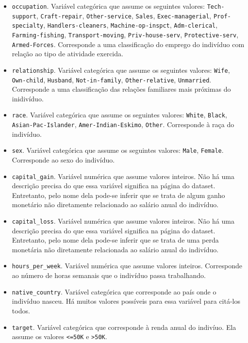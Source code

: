 \documentclass[a4paper, 12pt]{article}
\begin{document}
\begin{itemize}
    \item \verb|occupation|.
        Variável categórica que assume os seguintes valores:
        \verb|Tech-support|, \verb|Craft-repair|, \verb|Other-service|, \verb|Sales|, \verb|Exec-managerial|, \verb|Prof-specialty|, \verb|Handlers-cleaners|, \verb|Machine-op-inspct|, \verb|Adm-clerical|, \verb|Farming-fishing|, \verb|Transport-moving|, \verb|Priv-house-serv|, \verb|Protective-serv|, \verb|Armed-Forces|.
       Corresponde a uma classificação do emprego do indivíduo com relação ao tipo de atividade exercida.
       
    \item \verb|relationship|.
        Variável categórica que assume os seguintes valores:
        \verb|Wife|, \verb|Own-child|, \verb|Husband|, \verb|Not-in-family|, \verb|Other-relative|, \verb|Unmarried|.
        Corresponde a uma classificação das relações familiares mais próximas do inidivíduo.

    \item \verb|race|.
        Variável categórica que assume os seguintes valores:
        \verb|White|, \verb|Black|, \verb|Asian-Pac-Islander|, \verb|Amer-Indian-Eskimo|, \verb|Other|.
        Corresponde à raça do indivíduo.

    \item \verb|sex|.
        Variável categórica que assume os seguintes valores:
        \verb|Male|, \verb|Female|.
        Corresponde ao sexo do indivíduo.

    \item \verb|capital_gain|.
        Variável numérica que assume valores inteiros.
        Não há uma descrição precisa do que essa variável significa na página do dataset.
        Entretanto, pelo nome dela pode-se inferir que se trata de algum ganho monetário não diretamente relacionado ao salário anual do indivíduo.

    \item \verb|capital_loss|.
        Variável numérica que assume valores inteiros.
        Não há uma descrição precisa do que essa variável significa na página do dataset.
        Entretanto, pelo nome dela pode-se inferir que se trata de uma perda monetária não diretamente relacionada ao salário anual do indivíduo.

    \item \verb|hours_per_week|.
        Variável numérica que assume valores inteiros.
        Corresponde ao número de horas semanais que o indivíduo passa trabalhando.

    \item \verb|native_country|.
        Variável categórica que corresponde ao país onde o indivíduo nasceu.
        Há muitos valores possíveis para essa variável para citá-los todos.

    \item \verb|target|.
        Variável categórica que corresponde à renda anual do indivíuo.
        Ela assume os valores \verb|<=50K| e \verb|>50K|.

\end{itemize}
\end{document}
